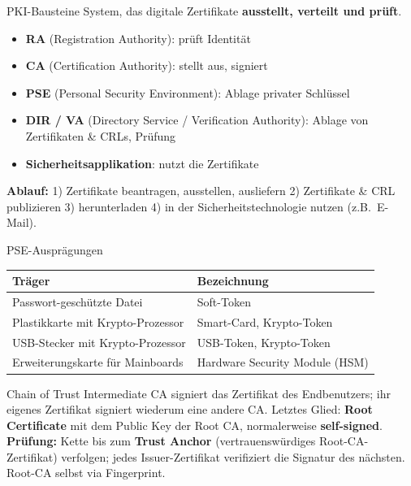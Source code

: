 \documentclass[a4paper, fontsize=7pt]{scrartcl}
\renewcommand*{\arraystretch}{1.5}  %
\begin{document}
\begin{mainbox}{PKI-Bausteine}
System, das digitale Zertifikate \textbf{ausstellt, verteilt und prüft}.
\begin{itemize}
    \item \textbf{RA} (Registration Authority): prüft Identität
    \item \textbf{CA} (Certification Authority): stellt aus, signiert
    \item \textbf{PSE} (Personal Security Environment): Ablage privater Schlüssel
    \item \textbf{DIR / VA} (Directory Service / Verification Authority): Ablage
          von Zertifikaten \& CRLs, Prüfung
    \item \textbf{Sicherheitsapplikation}: nutzt die Zertifikate
\end{itemize}
\textbf{Ablauf:} 1) Zertifikate beantragen, ausstellen, ausliefern
2) Zertifikate \& CRL publizieren 3) herunterladen 4) in der Sicherheitstechnologie
nutzen (z.B.\ E-Mail).
\end{mainbox}

\begin{mainbox}{PSE-Ausprägungen}
\renewcommand*{\arraystretch}{1.2}
\begin{tabularx}{\linewidth}{@{}>{\raggedright\arraybackslash}X|>{\raggedright\arraybackslash}X@{}}
\textbf{Träger} & \textbf{Bezeichnung} \\
\hline
Passwort-geschützte Datei & Soft-Token \\
Plastikkarte mit Krypto-Prozessor & Smart-Card, Krypto-Token \\
USB-Stecker mit Krypto-Prozessor & USB-Token, Krypto-Token \\
Erweiterungskarte für Mainboards & Hardware Security Module (HSM) \\
\end{tabularx}
\end{mainbox}

\begin{mainbox}{Chain of Trust}
Intermediate CA signiert das Zertifikat des Endbenutzers; ihr eigenes Zertifikat
signiert wiederum eine andere CA. Letztes Glied: \textbf{Root Certificate} mit dem Public Key
der Root CA, normalerweise \textbf{self-signed}.\\
\textbf{Prüfung:} Kette bis zum \textbf{Trust Anchor} (vertrauenswürdiges
Root-CA-Zertifikat) verfolgen; jedes Issuer-Zertifikat verifiziert die Signatur des
nächsten. Root-CA selbst via Fingerprint.
\end{mainbox}
\end{document}
